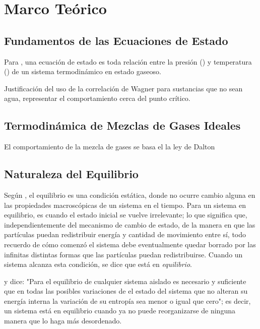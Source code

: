 \section{Marco Teórico}
\label{sec:marco_teorico}

    \subsection{Fundamentos de las Ecuaciones de Estado}
        Para \textcite{bib:thermo:goodstein2002states}, una ecuación de estado es toda relación entre la presión (\pressure[]{}) y temperatura (\temperature[]{}) de un sistema termodinámico en estado gaseoso.

        
    Justificación del uso de la correlación de Wagner para sustancias que no sean agua, representar el comportamiento cerca del punto crítico.



    \subsection{Termodinámica de Mezclas de Gases Ideales}
        El comportamiento de la mezcla de gases se basa el la ley de Dalton

    \subsection{Naturaleza del Equilibrio}
        Según \textcite{bib:thermo:VanNess}, el equilibrio es una condición estática, donde no ocurre cambio alguna en las propiedades macroscópicas de un sistema en el tiempo.
        Para \textcite{bib:thermo:goodstein2002states} un sistema en equilibrio, es cuando el estado inicial se vuelve irrelevante; lo que significa que, independientemente del mecanismo de cambio de estado, de la manera en que las partículas puedan redistribuir energía y cantidad de movimiento entre sí, todo recuerdo de cómo comenzó el sistema debe eventualmente quedar borrado por las infinitas distintas formas que las partículas puedan redistribuirse. Cuando un sistema alcanza esta condición, se dice que está en \textit{equilibrio}.

        y \textcite{bib:thermo:gibbs1874} dice: "Para el equilibrio de cualquier sistema aislado es necesario y suficiente que en todas las posibles variaciones de el estado del sistema que no alteran su energía interna la variación de su entropía sea menor o igual que cero"; es decir, un sistema está en equilibrio cuando ya no puede reorganizarse de ninguna manera que lo haga más desordenado.

